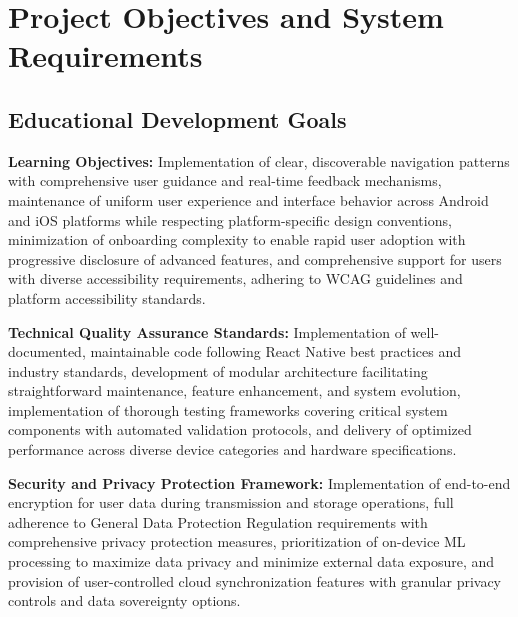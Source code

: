 \chapter{Project Objectives and System Requirements}

\section{Educational Development Goals}

\textbf{Learning Objectives:} Implementation of clear, discoverable navigation patterns with comprehensive user guidance and real-time feedback mechanisms, maintenance of uniform user experience and interface behavior across Android and iOS platforms while respecting platform-specific design conventions, minimization of onboarding complexity to enable rapid user adoption with progressive disclosure of advanced features, and comprehensive support for users with diverse accessibility requirements, adhering to WCAG guidelines and platform accessibility standards.

\textbf{Technical Quality Assurance Standards:} Implementation of well-documented, maintainable code following React Native best practices and industry standards, development of modular architecture facilitating straightforward maintenance, feature enhancement, and system evolution, implementation of thorough testing frameworks covering critical system components with automated validation protocols, and delivery of optimized performance across diverse device categories and hardware specifications.

\textbf{Security and Privacy Protection Framework:} Implementation of end-to-end encryption for user data during transmission and storage operations, full adherence to General Data Protection Regulation requirements with comprehensive privacy protection measures, prioritization of on-device ML processing to maximize data privacy and minimize external data exposure, and provision of user-controlled cloud synchronization features with granular privacy controls and data sovereignty options.

